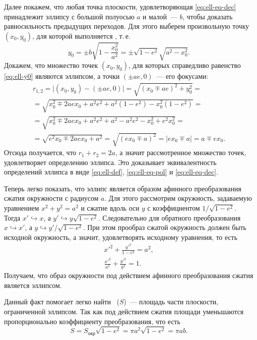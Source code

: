 Далее покажем, что любая точка плоскости, удовлетворяющая \eqref{eq:ell-eq-dec} принадлежит эллипсу с большой полуосью $a$ и малой~--- $b$, чтобы доказать равносильность предыдущих переходов. Для этого выберем произвольную точку $(x_0, y_0)$, для которой выполняется \label{eq:ell-eq-dec}, т.\,е.
\begin{equation}
	y_0 = \pm b \sqrt{1 - \frac{x_0^2}{a^2}} = \pm \sqrt{1 - e^2} \sqrt{a^2 - x_0^2}. \label{eq:ell-y0}
\end{equation}
Докажем, что множество точек $(x_0, y_0)$, для которых справедливо равенство \eqref{eq:ell-y0} являются эллипсом, а точки $(\pm a e, 0)$~--- его фокусами:
\begin{multline*}
	r_{1,2}
	= \big| (x_0, y_0) - (\pm ae, 0) \big|
	= \sqrt{(x_0 \mp ae)^2 + y_0^2} =\\
	= \sqrt{x_0^2 \mp 2 a e x_0 + a^2 e^2 + a^2(1 - e^2) - x_0^2(1 - e^2)} =\\
	= \sqrt{x_0^2 \mp 2 a e x_0 + a^2 e^2 + a^2 - a^2 e^2 - x_0^2 + e^2 x_0^2} = \\
	= \sqrt{e^2 x_0 \mp 2 a e x_0 + a^2 } = \sqrt{(e x_0 \mp a)^2} = |e x_0 \mp a| = a \mp ex_0.
\end{multline*}
Отсюда получается, что $r_1 + r_2 = 2a$, а значит рассмотренное множество точек, удовлетворяет определению эллипса. Это доказывает эквивалентность определений эллипса в виде \eqref{eq:ell-def}, \eqref{eq:ell-eq-pol} и \eqref{eq:ell-eq-dec}.

Теперь легко показать, что эллипс является образом афинного преобразования сжатия окружности с радиусом $a$. Для этого рассмотрим окружность, задаваемую уравнением $x^2 + y^2 = a^2$ и сжатие вдоль оси $y$ с коэффициентом $1/\sqrt{1 - e^2}$. Тогда $x' \hookrightarrow x$, а $y' \hookrightarrow y \sqrt{1-e^2}$. Следовательно для обратного преобразования $x \hookrightarrow x'$, а $y \hookrightarrow y'/\sqrt{1 - e^2}$. При этом прообраз сжатой окружность должен быть исходной окружность, а значит, удовлетворять исходному уравнения, то есть
\begin{gather*}
	x'^2 + \frac{y'^2}{1 - e^2} = a^2,\\
	\frac{x'^2}{a^2} + \frac{y'^2}{b^2} = 1.
\end{gather*}
Получаем, что образ окружности под действием афинного преобразования сжатия является эллипсом.

Данный факт помогает легко найти ~($S$)~--- площадь части
плоскости, ограниченной эллипсом. Так как под действием сжатия площади уменьшаются пропорционально коэффициенту преобразования, что есть
\begin{equation}
	S = S_\text{окр} \sqrt{1 - e^2} = \pi a^2 \sqrt{1 - e^2} = \pi a b.
\end{equation}

